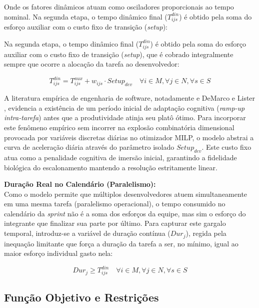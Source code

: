 \documentclass[a4paper,11pt]{article}
\begin{document}
Onde os fatores dinâmicos atuam como osciladores proporcionais ao tempo nominal. Na segunda etapa, o tempo dinâmico final ($T^{din}_{ijs}$) é obtido pela soma do esforço auxiliar com o custo fixo de transição (\textit{setup}):

Na segunda etapa, o tempo dinâmico final ($T^{din}_{ijs}$) é obtido pela soma do esforço auxiliar com o custo fixo de transição (\textit{setup}), que é cobrado integralmente sempre que ocorre a alocação da tarefa ao desenvolvedor:

\begin{equation}
    T^{din}_{ijs} = T^{aux}_{ijs} + w_{ijs} \cdot Setup_{dev} \quad \forall i \in M, \forall j \in N, \forall s \in S
\end{equation}

A literatura empírica de engenharia de software, notadamente \citet{mcconnell1996} e DeMarco e Lister \citep{demarco1987}, evidencia a existência de um período inicial de adaptação cognitiva (\textit{ramp-up intra-tarefa}) antes que a produtividade atinja seu platô ótimo. Para incorporar este fenômeno empírico sem incorrer na explosão combinatória dimensional provocada por variáveis discretas diárias no otimizador MILP, o modelo abstrai a curva de aceleração diária através do parâmetro isolado $Setup_{dev}$. Este custo fixo atua como a penalidade cognitiva de imersão inicial, garantindo a fidelidade biológica do escalonamento mantendo a resolução estritamente linear.

\vspace{0.2cm}
\noindent\textbf{Duração Real no Calendário (Paralelismo):} \\
Como o modelo permite que múltiplos desenvolvedores atuem simultaneamente em uma mesma tarefa (paralelismo operacional), o tempo consumido no calendário da \textit{sprint} não é a soma dos esforços da equipe, mas sim o esforço do integrante que finalizar sua parte por último. Para capturar este gargalo temporal, introduz-se a variável de duração contínua ($Dur_j$), regida pela inequação limitante que força a duração da tarefa a ser, no mínimo, igual ao maior esforço individual gasto nela:

\begin{equation}
    Dur_{j} \ge T^{din}_{ijs} \quad \forall i \in M, \forall j \in N, \forall s \in S
\end{equation}

\subsection{Função Objetivo e Restrições}
\end{document}
